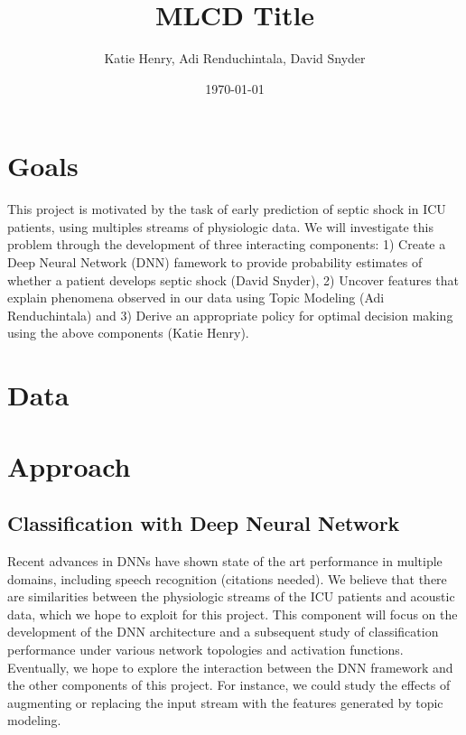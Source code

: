 \documentclass[dvips,12pt]{article}
\begin{document}

\title{MLCD Title}
\author{Katie Henry, Adi Renduchintala, David Snyder}
\date{\today}



\maketitle


\section{Goals}
This project is motivated by the task of early prediction of septic shock in ICU patients, using multiples streams of physiologic data. 
We will investigate this problem through the development of three interacting components:
1) Create a Deep Neural Network (DNN) famework to provide probability estimates of whether a patient develops septic shock (David Snyder),
2) Uncover features that explain phenomena observed in our data using Topic Modeling (Adi Renduchintala) and
3) Derive an appropriate policy for optimal decision making using the above components (Katie Henry).


\section{Data}

\section{Approach}

\subsection{Classification with Deep Neural Network}

Recent advances in DNNs have shown state of the art performance in multiple domains, including speech recognition (citations needed). We believe that there are similarities between the physiologic streams of the ICU patients and acoustic data, which we hope to exploit for this project. This component will focus on the development of the DNN architecture and a subsequent study of classification performance under various network topologies and activation functions. 
Eventually, we hope to explore the interaction between the DNN framework and the other components of this project. 
For instance, we could study the effects of augmenting or replacing the input stream with the features generated by topic modeling.
\end{document}
